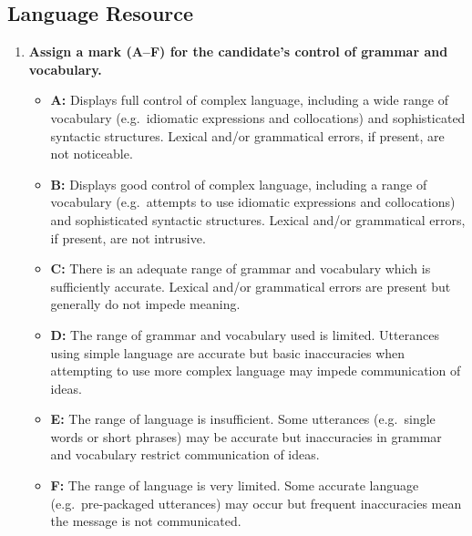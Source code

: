 \documentclass{report}
\begin{document}
\subsection*{Language Resource}
\begin{enumerate}
  \item \textbf{Assign a mark (A--F) for the candidate's control of grammar and vocabulary.}
  \begin{itemize}
    \item \textbf{A:} Displays full control of complex language, including a wide range of vocabulary (e.g.\ idiomatic expressions and collocations) and sophisticated syntactic structures. Lexical and/or grammatical errors, if present, are not noticeable.
    \item \textbf{B:} Displays good control of complex language, including a range of vocabulary (e.g.\ attempts to use idiomatic expressions and collocations) and sophisticated syntactic structures. Lexical and/or grammatical errors, if present, are not intrusive.
    \item \textbf{C:} There is an adequate range of grammar and vocabulary which is sufficiently accurate. Lexical and/or grammatical errors are present but generally do not impede meaning.
    \item \textbf{D:} The range of grammar and vocabulary used is limited. Utterances using simple language are accurate but basic inaccuracies when attempting to use more complex language may impede communication of ideas.
    \item \textbf{E:} The range of language is insufficient. Some utterances (e.g.\ single words or short phrases) may be accurate but inaccuracies in grammar and vocabulary restrict communication of ideas.
    \item \textbf{F:} The range of language is very limited. Some accurate language (e.g.\ pre-packaged utterances) may occur but frequent inaccuracies mean the message is not communicated.
  \end{itemize}
\end{enumerate}
\end{document}
